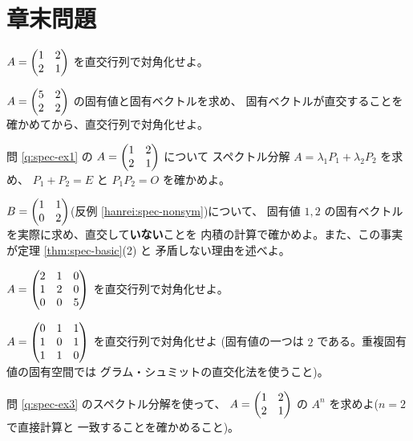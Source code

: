 \section*{章末問題}

\begin{mondai}[基本]\label{q:spec-ex1}
$A = \begin{pmatrix}1 & 2 \\ 2 & 1\end{pmatrix}$ を直交行列で対角化せよ。
\end{mondai}

\begin{mondai}[基本]\label{q:spec-ex2}
$A = \begin{pmatrix}5 & 2 \\ 2 & 2\end{pmatrix}$ の固有値と固有ベクトルを求め、
固有ベクトルが直交することを確かめてから、直交行列で対角化せよ。
\end{mondai}

\begin{mondai}[基本]\label{q:spec-ex3}
問 \ref{q:spec-ex1} の $A = \begin{pmatrix}1 & 2 \\ 2 & 1\end{pmatrix}$ について
スペクトル分解 $A = \lambda_1P_1 + \lambda_2P_2$ を求め、
$P_1 + P_2 = E$ と $P_1P_2 = O$ を確かめよ。
\end{mondai}

\begin{mondai}[基本]\label{q:spec-ex4}
$B = \begin{pmatrix}1 & 1 \\ 0 & 2\end{pmatrix}$(反例 \ref{hanrei:spec-nonsym})について、
固有値 $1, 2$ の固有ベクトルを実際に求め、直交して\textbf{いない}ことを
内積の計算で確かめよ。また、この事実が定理 \ref{thm:spec-basic}(2) と
矛盾しない理由を述べよ。
\end{mondai}

\begin{mondai}[標準]\label{q:spec-ex5}
$A = \begin{pmatrix}2 & 1 & 0 \\ 1 & 2 & 0 \\ 0 & 0 & 5\end{pmatrix}$ を直交行列で対角化せよ。
\end{mondai}

\begin{mondai}[標準]\label{q:spec-ex6}
$A = \begin{pmatrix}0 & 1 & 1 \\ 1 & 0 & 1 \\ 1 & 1 & 0\end{pmatrix}$ を直交行列で対角化せよ
(固有値の一つは $2$ である。重複固有値の固有空間では
グラム・シュミットの直交化法を使うこと)。
\end{mondai}

\begin{mondai}[標準]\label{q:spec-ex7}
問 \ref{q:spec-ex3} のスペクトル分解を使って、
$A = \begin{pmatrix}1 & 2 \\ 2 & 1\end{pmatrix}$ の $A^n$ を求めよ($n = 2$ で直接計算と
一致することを確かめること)。
\end{mondai}

